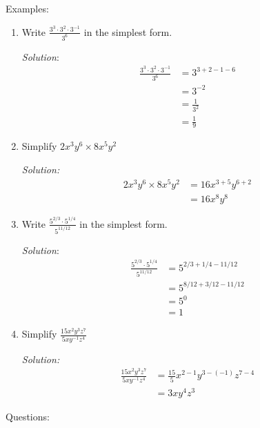 \documentclass[16pt]{article}
\theoremstyle{remark}
\begin{document}
Examples:
\begin{enumerate}
\item  Write $\displaystyle{\frac{3^3 \cdot 3^2 \cdot 3^{-1}}{3^6}}$ in the simplest form.
\begin{mdframed}[style=TheoremFrame]
\textit{Solution}:
\begin{align*}
\frac{3^3 \cdot 3^2 \cdot 3^{-1}}{3^6} &= 3^{3+2-1-6}\\
&= 3^{-2}\\
&= \frac{1}{3^2}\\
&= \frac{1}{9}
\end{align*}
\end{mdframed}
\newpage
\item Simplify $\displaystyle{2x^3 y^6 \times 8x^5 y^2}$
\begin{mdframed}[style=TheoremFrame]
\textit{Solution:}
\begin{align*}
2x^3 y^6 \times 8x^5 y^2 &= 16x^{3+5} y^{6+2}\\
&= 16 x^8 y^8
\end{align*}
\end{mdframed}
\item Write $\displaystyle{\frac{5^{2/3} \cdot 5^{1/4}}{5^{11/12}}}$ in the simplest form.
\begin{mdframed}[style=TheoremFrame]
\textit{Solution}:
\begin{align*}
\frac{5^{2/3} \cdot 5^{1/4}}{5^{11/12}} &= 5^{2/3 + 1/4 - 11/12}\\
&= 5^{8/12 + 3/12 - 11/12}\\
&= 5^0\\
&=1
\end{align*}
\end{mdframed}
\item Simplify $\displaystyle{\frac{15x^2y^3z^7}{5xy^{-1}z^4}}$
\begin{mdframed}[style=TheoremFrame]
\textit{Solution:}
\begin{align*}
\frac{15x^2y^3z^7}{5xy^{-1}z^4} &= \frac{15}{5} x^{2-1} y^{3 - (-1)} z^{7-4}\\
&= 3 x y^4 z^3
\end{align*}
\end{mdframed}
\end{enumerate}
Questions:
\end{document}
